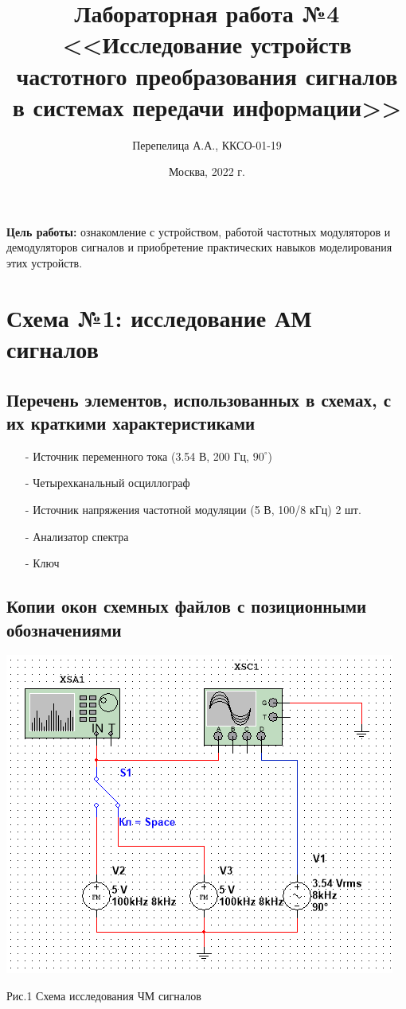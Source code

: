 \documentclass[11pt]{article}
\title{\textbf{Лабораторная работа №4\\<<Исследование устройств частотного преобразования сигналов в системах передачи информации>>}}
\author{Перепелица А.А., ККСО-01-19}
\date{Москва, 2022 г.}
\begin{document}
\maketitle
\thispagestyle{empty}
\textbf{Цель работы:} ознакомление с устройством, работой частотных 
модуляторов и демодуляторов сигналов и приобретение практических навыков 
моделирования этих устройств. 

\section{Схема №1: исследование АМ сигналов}
\subsection{Перечень элементов, использованных в схемах, с
их краткими характеристиками}
\begin{itemize}
    \item[-] Источник переменного тока (3.54 В, 200 Гц, $90^\circ$)
    \item[-] Четырехканальный осциллограф
    \item[-] Источник напряжения частотной модуляции (5 В, 100/8 кГц) 2 шт.
    \item[-] Анализатор спектра 
    \item[-] Ключ
\end{itemize}


\subsection{Копии окон схемных файлов с позиционными обозначениями}
\includegraphics[width=1\linewidth]{img/scheme1.png}
\begin{center}
    Рис.1 Схема исследования ЧМ сигналов
\end{center}
\end{document}
